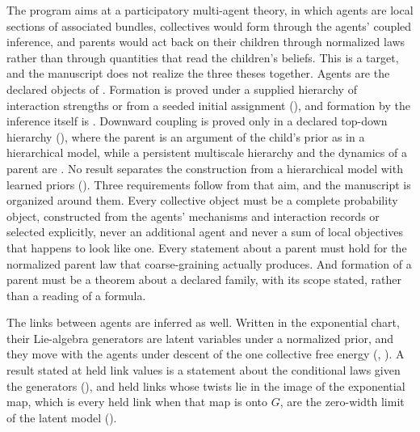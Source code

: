 The program aims at a participatory multi-agent theory, in which agents are local sections of
associated bundles, collectives would form through the agents' coupled inference, and parents would act
back on their children through normalized laws rather than through quantities that read the children's
beliefs. This is a target, and the manuscript does not realize the three theses together. Agents are
the declared objects of . Formation is proved under a supplied hierarchy of
interaction strengths or from a seeded initial assignment
(), and formation by the
inference itself is . Downward coupling is proved only in a declared
top-down hierarchy (), where the parent is an argument of the
child's prior as in a hierarchical model, while a persistent multiscale hierarchy and the dynamics of a
parent are . No result separates the
construction from a hierarchical model with learned priors (). Three requirements
follow from that aim, and the manuscript is organized around them. Every collective object must be a
complete probability object, constructed from the agents' mechanisms and interaction records or selected
explicitly, never an additional agent and never a sum of local objectives that happens to look like one.
Every statement about a parent must hold for the normalized parent law that coarse-graining actually
produces. And formation of a parent must be a theorem about a declared family, with its scope stated,
rather than a reading of a formula.

The links between agents are inferred as well. Written in the exponential chart, their Lie-algebra
generators are latent variables under a normalized prior, and they move with the agents under descent of
the one collective free energy (, ). A result stated at
held link values is a statement about the conditional laws given the generators
(), and held links whose twists lie in the image of the exponential
map, which is every held link when that map is onto $G$, are the zero-width limit of the latent model
().

